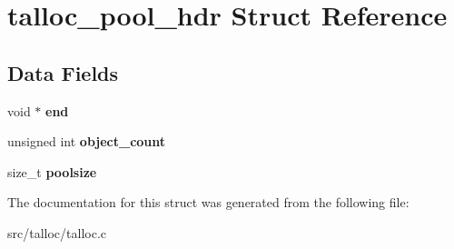 \hypertarget{structtalloc__pool__hdr}{}\section{talloc\+\_\+pool\+\_\+hdr Struct Reference}
\label{structtalloc__pool__hdr}
\subsection*{Data Fields}
\begin{DoxyCompactItemize}
\item 
\hypertarget{structtalloc__pool__hdr_a5a54820657ed4056ac9e31642002327f}{}void $\ast$ {\bfseries end}\label{structtalloc__pool__hdr_a5a54820657ed4056ac9e31642002327f}

\item 
\hypertarget{structtalloc__pool__hdr_a3dcfd22b3c30fe79278de6b9a1ac2c80}{}unsigned int {\bfseries object\+\_\+count}\label{structtalloc__pool__hdr_a3dcfd22b3c30fe79278de6b9a1ac2c80}

\item 
\hypertarget{structtalloc__pool__hdr_a38219b015408672d8086d0f98a2c2fb4}{}size\+\_\+t {\bfseries poolsize}\label{structtalloc__pool__hdr_a38219b015408672d8086d0f98a2c2fb4}

\end{DoxyCompactItemize}


The documentation for this struct was generated from the following file\+:\begin{DoxyCompactItemize}
\item 
src/talloc/talloc.\+c\end{DoxyCompactItemize}
